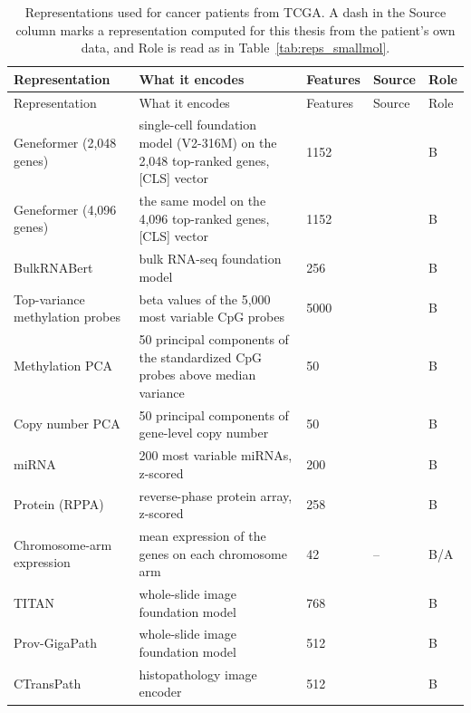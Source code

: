 {\let\small\footnotesize
\begin{longtable}{P{3.0cm}P{5.0cm}P{1.5cm}P{1.5cm}P{1.4cm}}
\caption[Representations used for cancer patients.]{Representations used for cancer patients from TCGA. A dash in the Source column marks a representation computed for this thesis from the patient's own data, and Role is read as in Table~\ref{tab:reps_smallmol}.}\label{tab:reps_tcga}\\
\toprule
Representation & What it encodes & Features & Source & Role \\
\midrule
\endfirsthead
\toprule
Representation & What it encodes & Features & Source & Role \\
\midrule
\endhead
\bottomrule
\endfoot
Geneformer (2,048 genes) & single-cell foundation model (V2-316M) on the 2,048 top-ranked genes, [CLS] vector & 1152 & \citep{Theodoris2023, Chen2026Geneformer} & B \\
Geneformer (4,096 genes) & the same model on the 4,096 top-ranked genes, [CLS] vector & 1152 & \citep{Theodoris2023, Chen2026Geneformer} & B \\
BulkRNABert & bulk RNA-seq foundation model & 256 & \citep{Gelard2024} & B \\
Top-variance methylation probes & beta values of the 5,000 most variable CpG probes & 5000 & \citep{Goldman2020} & B \\
Methylation PCA & 50 principal components of the standardized CpG probes above median variance & 50 & \citep{Goldman2020} & B \\
Copy number PCA & 50 principal components of gene-level copy number & 50 & \citep{Mermel2011} & B \\
miRNA & 200 most variable miRNAs, z-scored & 200 & \citep{Goldman2020} & B \\
Protein (RPPA) & reverse-phase protein array, z-scored & 258 & \citep{Li2013TCPA} & B \\
Chromosome-arm expression & mean expression of the genes on each chromosome arm & 42 & -- & B/A \\
TITAN & whole-slide image foundation model & 768 & \citep{Ding2024TITAN} & B \\
Prov-GigaPath & whole-slide image foundation model & 512 & \citep{Xu2024GigaPath} & B \\
CTransPath & histopathology image encoder & 512 & \citep{Wang2022CTransPath} & B \\

\end{longtable}}
